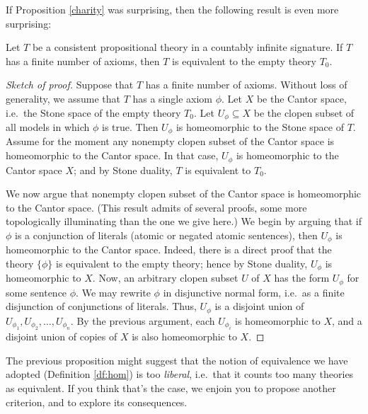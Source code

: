 If Proposition \ref{charity} was surprising, then the following result
is even more surprising:

\begin{prop} Let $T$ be a consistent propositional theory in a
  countably infinite signature.  If $T$ has a finite number of axioms,
  then $T$ is equivalent to the empty theory $T_0$. \end{prop}


\begin{proof}[Sketch of proof] Suppose that $T$ has a finite number of
  axioms.  Without loss of generality, we assume that $T$ has a single
  axiom $\phi$.  Let $X$ be the Cantor space, i.e.\ the Stone space of
  the empty theory $T_0$.  Let $U_\phi\subseteq X$ be the clopen
  subset of all models in which $\phi$ is true.  Then $U_\phi$ is
  homeomorphic to the Stone space of $T$.  Assume for the moment any
  nonempty clopen subset of the Cantor space is homeomorphic to the
  Cantor space.  In that case, $U_\phi$ is homeomorphic to the Cantor
  space $X$; and by Stone duality, $T$ is equivalent to $T_0$.

  We now argue that nonempty clopen subset of the Cantor space is
  homeomorphic to the Cantor space.  (This result admits of several
  proofs, some more topologically illuminating than the one we give
  here.)  We begin by arguing that if $\phi$ is a conjunction of
  literals (atomic or negated atomic sentences), then $U_\phi$ is
  homeomorphic to the Cantor space.  Indeed, there is a direct proof
  that the theory $\{ \phi \}$ is equivalent to the empty theory;
  hence by Stone duality, $U_\phi$ is homeomorphic to $X$.  Now, an
  arbitrary clopen subset $U$ of $X$ has the form $U_\phi$ for some
  sentence $\phi$.  We may rewrite $\phi$ in disjunctive normal form,
  i.e.\ as a finite disjunction of conjunctions of literals.  Thus,
  $U_\phi$ is a disjoint union of
  $U_{\phi _1},U_{\phi _2},\dots ,U_{\phi _n}$.  By the previous
  argument, each $U_{\phi _i}$ is homeomorphic to $X$, and a disjoint
  union of copies of $X$ is also homeomorphic to $X$.
\end{proof}

The previous proposition might suggest that the notion of equivalence
we have adopted (Definition \ref{df:hom}) is too {\it liberal}, i.e.\
that it counts too many theories as equivalent.  If you think that's
the case, we enjoin you to propose another criterion, and to explore
its consequences.


